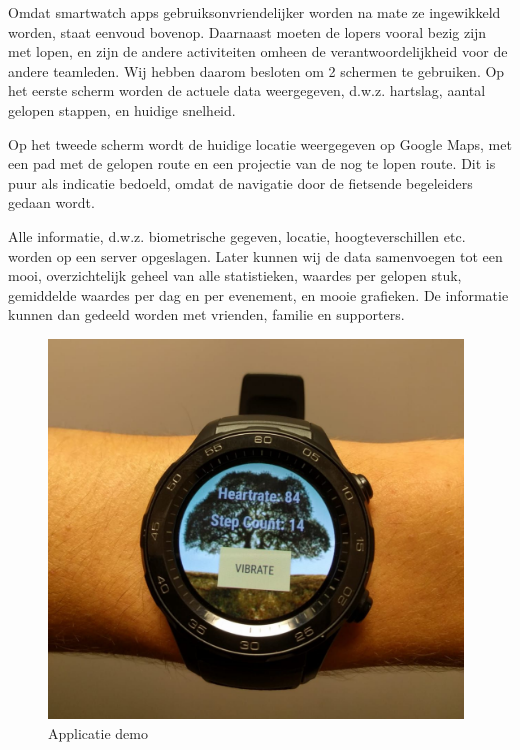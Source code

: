 \documentclass[../main.tex]{subfiles}
\begin{document}
Omdat smartwatch apps gebruiksonvriendelijker worden na mate ze ingewikkeld worden, staat eenvoud bovenop. Daarnaast moeten de lopers vooral bezig zijn met lopen, en zijn de andere activiteiten omheen de verantwoordelijkheid voor de andere teamleden.
Wij hebben daarom besloten om 2 schermen te gebruiken. Op het eerste scherm worden de actuele data weergegeven, d.w.z. hartslag, aantal gelopen stappen, en huidige snelheid.

Op het tweede scherm wordt de huidige locatie weergegeven op Google Maps, met een pad met de gelopen route en een projectie van de nog te lopen route. Dit is puur als indicatie bedoeld, omdat de navigatie door de fietsende begeleiders gedaan wordt.

Alle informatie, d.w.z. biometrische gegeven, locatie, hoogteverschillen etc. worden op een server opgeslagen. Later kunnen wij de data samenvoegen tot een mooi, overzichtelijk geheel van alle statistieken, waardes per gelopen stuk, gemiddelde waardes per dag en per evenement, en mooie grafieken. De informatie kunnen dan gedeeld worden met vrienden, familie en supporters.

\begin{figure}[h]
    \centering
	\caption{Applicatie demo}
    \label{fig:demo}
    \includegraphics[width=110mm]{demo.jpg}
\end{figure}
\end{document}

